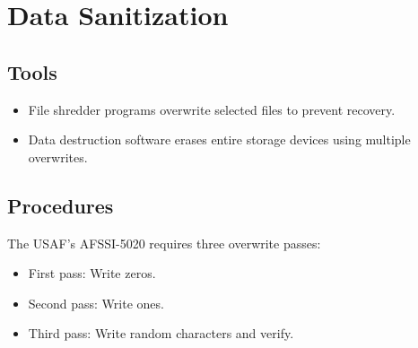 \section{Data Sanitization}
\subsection{Tools}
\begin{itemize}
    \item File shredder programs overwrite selected files to prevent recovery.
    \item Data destruction software erases entire storage devices using multiple overwrites.
\end{itemize}
\subsection{Procedures}
The USAF’s AFSSI-5020 requires three overwrite passes:
\begin{itemize}
    \item First pass: Write zeros.
    \item Second pass: Write ones.
    \item Third pass: Write random characters and verify.
\end{itemize}

